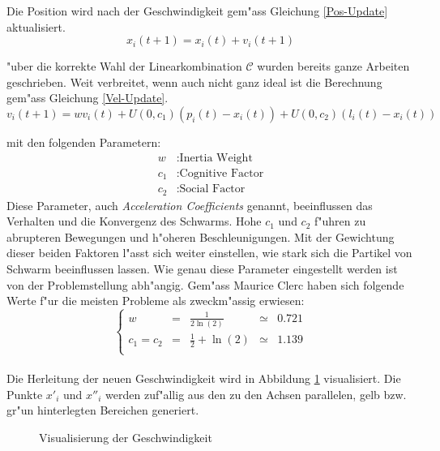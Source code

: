 Die Position wird nach der Geschwindigkeit gem"ass Gleichung
\ref{Pos-Update} aktualisiert. \\
\begin{equation}
	x_{i}(t+1) = x_i(t) + v_i(t+1) \label{Pos-Update}
\end{equation}

"uber die korrekte Wahl der Linearkombination $\mathcal{C}$ wurden bereits
ganze Arbeiten geschrieben. Weit verbreitet, wenn auch nicht ganz ideal
ist die Berechnung gem"ass Gleichung \ref{Vel-Update}. \\
\begin{equation}
	v_i(t+1) = w v_i(t) + U(0,c_1) (p_i(t)-x_i(t)) + U(0,c_2) (l_i(t)-x_i(t))\label{Vel-Update}
\end{equation}

mit den folgenden Parametern:
\begin{align*}
	w &: \text{Inertia Weight} \\
	c_1 &: \text{Cognitive Factor} \\
	c_2 &: \text{Social Factor}
\end{align*}
Diese Parameter, auch \textit{Acceleration Coefficients} genannt,
beeinflussen das  Verhalten und die Konvergenz des Schwarms. Hohe
$c_1$ und $c_2$ f"uhren zu abrupteren Bewegungen und h"oheren
Beschleunigungen. Mit der Gewichtung dieser beiden Faktoren l"asst sich
weiter einstellen, wie stark sich die Partikel von Schwarm beeinflussen
lassen. Wie genau diese Parameter eingestellt werden ist von der
Problemstellung abh"angig. Gem"ass Maurice Clerc \cite{Clerc-Stagnation}
haben sich folgende Werte f"ur die meisten Probleme als zweckm"assig
erwiesen:
\begin{equation}
	\left\lbrace \begin{array}{lllll}
		w & = & \frac{1}{2 \ln(2)} & \simeq & 0.721 \\
		c_1 = c_2 & = & \frac{1}{2} + \ln(2) & \simeq & 1.139 \\
	\end{array}	\right. 
\end{equation} \\


Die Herleitung der neuen Geschwindigkeit wird in Abbildung
\ref{Fig-Visualisierung-Geschwindigkeit} visualisiert. Die Punkte $x'_i$
und $x''_i$ werden zuf"allig aus den zu den Achsen parallelen, gelb
bzw. gr"un hinterlegten Bereichen generiert.  \\
\begin{figure}[htbp]
	\centering
	
	\caption{Visualisierung der Geschwindigkeit}
	\label{Fig-Visualisierung-Geschwindigkeit}
\end{figure}


